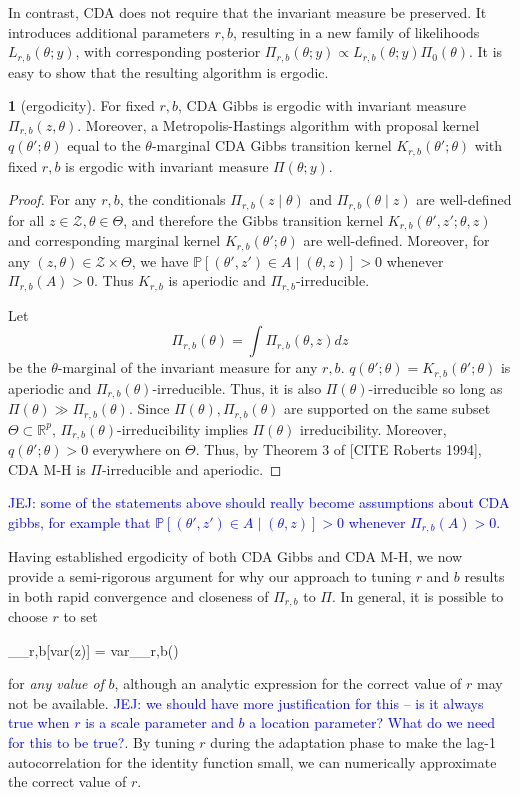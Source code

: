 \documentclass[a4paper,11pt]{article}%
\theoremstyle{example} \theoremstyle{remark} \theoremstyle{lemma}
\theoremstyle{definition} \theoremstyle{corol}
\theoremstyle{proposition} \theoremstyle{condition}
\theoremstyle{assumption}
\newtheorem{remark}{\n{Remark}}[section]
\newcommand{\bb}[1]{\mathbb{#1}}
\def\var{{\mbox{var}}}
\newcommand{\1}{\\[1ex]}
\newcommand{\2}{\\[2ex]}
\newcommand{\3}{\\[3ex]}
\newcommand{\4}{\\[4ex]}
\newcommand{\mc}[1]{\mathcal{#1}}
\def \be{\begin{equs}}
\def \ee{\end{equs}}
\newcommand{\James}[1]{\textcolor{blue}{JEJ: #1}}
\begin{document}
In contrast, CDA does not require that the invariant measure be preserved. It introduces additional parameters $r,b$, resulting in a new family of likelihoods $L_{r,b}(\theta;y)$, with corresponding posterior $\Pi_{r,b}(\theta;y) \propto L_{r,b}(\theta;y) \Pi_0(\theta)$. It is easy to show that the resulting algorithm is ergodic.
\begin{remark}[ergodicity]
For fixed $r,b$, CDA Gibbs is ergodic with invariant measure $\Pi_{r,b}(z,\theta)$. Moreover, a Metropolis-Hastings algorithm with proposal kernel $q(\theta';\theta)$ equal to the $\theta$-marginal CDA Gibbs transition kernel $K_{r,b}(\theta';\theta)$ with fixed $r,b$ is ergodic with invariant measure $\Pi(\theta;y)$.
\end{remark}
\begin{proof}
For any $r,b$, the conditionals $\Pi_{r,b}(z \mid \theta)$ and $\Pi_{r,b}(\theta \mid z)$ are well-defined for all $z \in \mc Z, \theta \in \Theta$, and therefore the Gibbs transition kernel $K_{r,b}(\theta',z';\theta,z)$ and corresponding marginal kernel $K_{r,b}(\theta';\theta)$ are well-defined. Moreover, for any $(z,\theta) \in \mc Z \times \Theta$, we have $\bb P[(\theta',z') \in A \mid (\theta,z)] > 0$ whenever $\Pi_{r,b}(A) > 0$. Thus $K_{r,b}$ is aperiodic and $\Pi_{r,b}$-irreducible.

Let 
$$\Pi_{r,b}(\theta) = \int \Pi_{r,b}(\theta,z) dz$$
be the $\theta$-marginal of the invariant measure for any $r,b$. $q(\theta';\theta) = K_{r,b}(\theta';\theta)$ is aperiodic and $\Pi_{r,b}(\theta)$-irreducible. Thus, it is also $\Pi(\theta)$-irreducible so long as $\Pi(\theta) \gg \Pi_{r,b}(\theta)$. Since $\Pi(\theta), \Pi_{r,b}(\theta)$ are supported on the same subset $\Theta \subset \bb R^p$, $\Pi_{r,b}(\theta)$-irreducibility implies $\Pi(\theta)$ irreducibility. Moreover, $q(\theta';\theta) > 0$ everywhere on $\Theta$. Thus, by Theorem 3 of [CITE Roberts 1994], CDA M-H is $\Pi$-irreducible and aperiodic. 
\end{proof}

\James{some of the statements above should really become assumptions about CDA gibbs, for example that $\bb P[(\theta',z') \in A \mid (\theta,z)] > 0$ whenever $\Pi_{r,b}(A) > 0$.}

Having established ergodicity of both CDA Gibbs and CDA M-H, we now provide a semi-rigorous argument for why our approach to tuning $r$ and $b$ results in both rapid convergence and closeness of $\Pi_{r,b}$ to $\Pi$. In general, it is possible to choose $r$ to set
\be
\bb E_{\Pi_{r,b}}[\var(\theta \mid z)] = \var_{\Pi_{r,b}}(\theta)
\ee
for \emph{any value of} $b$, although an analytic expression for the correct value of $r$ may not be available. \James{we should have more justification for this -- is it always true when $r$ is a scale parameter and $b$ a location parameter? What do we need for this to be true?}. By tuning $r$ during the adaptation phase to make the lag-1 autocorrelation for the identity function small, we can numerically approximate the correct value of $r$. 
\end{document}
